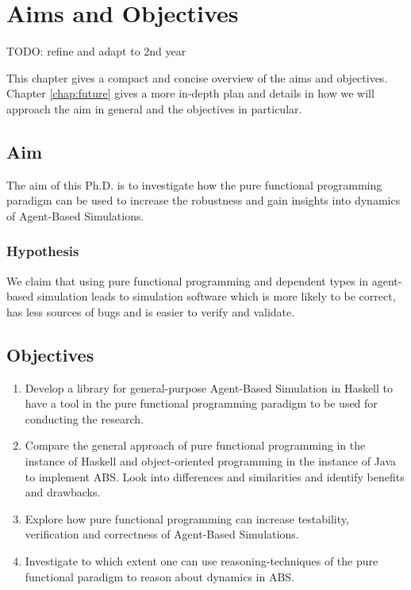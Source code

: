 \chapter{Aims and Objectives}
\label{chap:aimsObj}

TODO: refine and adapt to 2nd year

This chapter gives a compact and concise overview of the aims and objectives. Chapter \ref{chap:future} gives a more in-depth plan and details in how we will approach the aim in general and the objectives in particular.

\section{Aim}
The aim of this Ph.D. is to investigate how the pure functional programming paradigm can be used to increase the robustness and gain insights into dynamics of Agent-Based Simulations.

\subsection{Hypothesis}
We claim that using pure functional programming and dependent types in agent-based simulation leads to simulation software which is more likely to be correct, has less sources of bugs and is easier to verify and validate.

\section{Objectives}
\begin{enumerate}
	\item Develop a library for general-purpose Agent-Based Simulation in Haskell to have a tool in the pure functional programming paradigm to be used for conducting the research.

	\item Compare the general approach of pure functional programming in the instance of Haskell and object-oriented programming in the instance of Java to implement ABS. Look into differences and similarities and identify benefits and drawbacks.

	\item Explore how pure functional programming can increase testability, verification and correctness of Agent-Based Simulations.

	\item Investigate to which extent one can use reasoning-techniques of the pure functional paradigm to reason about dynamics in ABS.
\end{enumerate}